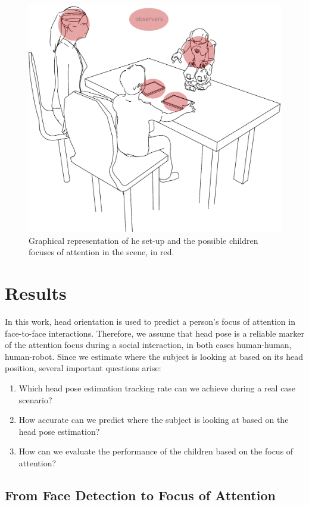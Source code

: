 \documentclass{sig-alternate}
\begin{document}
\begin{figure}
    \centering
    \includegraphics[width=0.7\columnwidth]{drawSetup}
    \caption{\small Graphical representation of he set-up and the possible children focuses of attention in the scene, in red.}
    \label{drawSetup}
\end{figure}


\section{Results}

In this work, head orientation is used to predict a person's focus of attention in face-to-face interactions. Therefore, we assume that head pose is a reliable marker of the attention focus during a social interaction, in both cases human-human, human-robot. Since we estimate where the subject is looking at based on its head position, several important questions arise:

\begin{enumerate}
\item Which head pose estimation tracking rate can we achieve during a real case scenario?  
\item How accurate can we predict where the subject is looking at based on the head pose estimation?
\item How can we evaluate the performance of the children based on the focus of attention?
\end{enumerate}


\subsection{From Face Detection to Focus of Attention}
\end{document}
